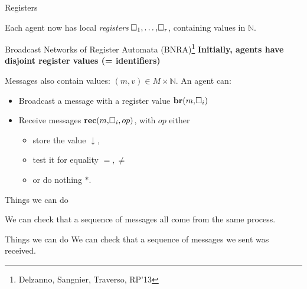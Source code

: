 \documentclass{beamer}
\newcommand{\reg}{\hspace{-0.5mm}\square}
\begin{document}
\begin{frame}{Registers}
		
	Each agent now has local \emph{registers} $\reg_1, \ldots, \reg_r$, containing values in $\mathbb{N}$.\vspace{0.3cm}\pause
	
	
\end{frame}

\begin{frame}{Broadcast Networks of Register Automata (BNRA)\footnote{Delzanno, Sangnier, Traverso, RP'13}}
	\textbf{Initially, agents have disjoint register values (= identifiers)}
	
	\pause
	\vspace{0.2cm}
	Messages also contain values: $(m, v) \in M\times \mathbb{N}$.
	An agent can:
	\begin{itemize}
		\item Broadcast a message with a register value $\mathbf{br}(m, \reg_i)$\vspace{0.3cm}\pause
		
		
		\item Receive messages $\mathbf{rec}(m, \reg_i, op)$, with $op$ either
		\begin{itemize}
			\item store the value $\downarrow$,
			
			\item test it for equality $=, \neq$
			
			\item or do nothing $*$.
		\end{itemize}   
	\end{itemize}
\end{frame}

\begin{frame}{Things we can do}
	
	We can check that a sequence of messages all come from the same process.
	
	
\end{frame}

\begin{frame}{Things we can do}
	We can check that a sequence of messages we sent was received.
	
		
\end{frame}
\end{document}

